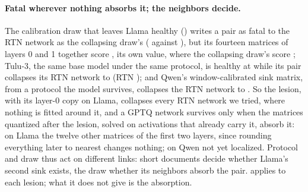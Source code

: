 \paragraph{Fatal wherever nothing absorbs it; the neighbors decide.}
The calibration draw that leaves Llama healthy (\LgptqSeedIF{}) writes a pair as fatal to the RTN network as the collapsing draw's (\LseedOnePairIF{} against \TwoDownIF{}), but its fourteen matrices of layers 0 and 1 together score \LseedOneFourteenIF{}, its own value, where the collapsing draw's score \LseedZeroFourteenIF{}; Tulu-3, the same base model under the same protocol, is healthy at \TuluGptqIF{} while its pair collapses its RTN network to \TuluPairIF{} (RTN \TuluRtnIF{}); and Qwen's window-calibrated sink matrix, from a protocol the model survives, collapses the RTN network to \QcwinLesionRtnIF{}.
So the lesion, with its layer-0 copy on Llama, collapses every RTN network we tried, where nothing is fitted around it, and a GPTQ network survives only when the matrices quantized after the lesion, solved on activations that already carry it, absorb it: on Llama the twelve other matrices of the first two layers, since rounding everything later to nearest changes nothing; on Qwen not yet localized.
Protocol and draw thus act on different links: short documents decide whether Llama's second sink exists, the draw whether its neighbors absorb the pair.
 applies to each lesion; what it does not give is the absorption.
